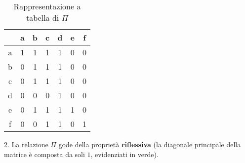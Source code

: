 \documentclass[\main/main.tex]{subfiles}
\begin{document}
\begin{table}
  \begin{tabular}{|c|c|c|c|c|c|c|}
    \hline
      & a                      & b                      & c                      & d                      & e                      & f                      \\
    \hline
    a & \cellcolor{green!25} 1 & 1                      & 1                      & 1                      & 0                      & 0                      \\
    \hline
    b & 0                      & \cellcolor{green!25} 1 & 1                      & 1                      & 0                      & 0                      \\
    \hline
    c & 0                      & 1                      & \cellcolor{green!25} 1 & 1                      & 0                      & 0                      \\
    \hline
    d & 0                      & 0                      & 0                      & \cellcolor{green!25} 1 & 0                      & 0                      \\
    \hline
    e & 0                      & 1                      & 1                      & 1                      & \cellcolor{green!25} 1 & 0                      \\
    \hline
    f & 0                      & 0                      & 1                      & 1                      & 0                      & \cellcolor{green!25} 1 \\
    \hline
  \end{tabular}
  \caption{Rappresentazione a tabella di $\Pi$}
\end{table}

2. La relazione $\Pi$ gode della proprietà \textbf{riflessiva} (la diagonale principale della matrice è composta da soli $1$, evidenziati in verde).
\end{document}

